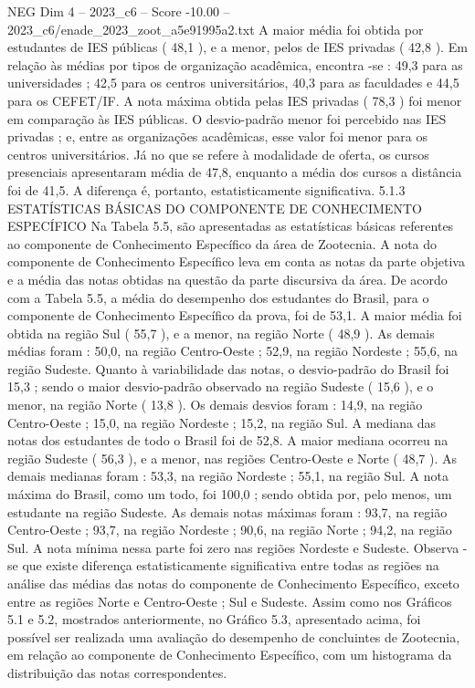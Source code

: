 \begin{textsample}{NEG Dim 4 – 2023\_c6 – Score -10.00 – 2023\_c6/enade\_2023\_zoot\_a5e91995a2.txt}
A maior média foi obtida por estudantes de IES públicas ( 48,1 ), e a menor, pelos de IES privadas ( 42,8 ).
Em relação às médias por tipos de organização acadêmica, encontra -se : 49,3 para as universidades ; 42,5 para os centros universitários, 40,3 para as faculdades e 44,5 para os CEFET/IF.
A nota máxima obtida pelas IES privadas ( 78,3 ) foi menor em comparação às IES públicas.
O desvio-padrão menor foi percebido nas IES privadas ; e, entre as organizações acadêmicas, esse valor foi menor para os centros universitários.
Já no que se refere à modalidade de oferta, os cursos presenciais apresentaram média de 47,8, enquanto a média dos cursos a distância foi de 41,5.
A diferença é, portanto, estatisticamente significativa. 5.1.3 ESTATÍSTICAS BÁSICAS DO COMPONENTE DE CONHECIMENTO ESPECÍFICO Na Tabela 5.5, são apresentadas as estatísticas básicas referentes ao componente de Conhecimento Específico da área de Zootecnia.
A nota do componente de Conhecimento Específico leva em conta as notas da parte objetiva e a média das notas obtidas na questão da parte discursiva da área.
De acordo com a Tabela 5.5, a média do desempenho dos estudantes do Brasil, para o componente de Conhecimento Específico da prova, foi de 53,1.
A maior média foi obtida na região Sul ( 55,7 ), e a menor, na região Norte ( 48,9 ).
As demais médias foram : 50,0, na região Centro-Oeste ; 52,9, na região Nordeste ; 55,6, na região Sudeste.
Quanto à variabilidade das notas, o desvio-padrão do Brasil foi 15,3 ; sendo o maior desvio-padrão observado na região Sudeste ( 15,6 ), e o menor, na região Norte ( 13,8 ).
Os demais desvios foram : 14,9, na região Centro-Oeste ; 15,0, na região Nordeste ; 15,2, na região Sul.
A mediana das notas dos estudantes de todo o Brasil foi de 52,8.
A maior mediana ocorreu na região Sudeste ( 56,3 ), e a menor, nas regiões Centro-Oeste e Norte ( 48,7 ).
As demais medianas foram : 53,3, na região Nordeste ; 55,1, na região Sul.
A nota máxima do Brasil, como um todo, foi 100,0 ; sendo obtida por, pelo menos, um estudante na região Sudeste.
As demais notas máximas foram : 93,7, na região Centro-Oeste ; 93,7, na região Nordeste ; 90,6, na região Norte ; 94,2, na região Sul.
A nota mínima nessa parte foi zero nas regiões Nordeste e Sudeste.
Observa -se que existe diferença estatisticamente significativa entre todas as regiões na análise das médias das notas do componente de Conhecimento Específico, exceto entre as regiões Norte e Centro-Oeste ; Sul e Sudeste.
Assim como nos Gráficos 5.1 e 5.2, mostrados anteriormente, no Gráfico 5.3, apresentado acima, foi possível ser realizada uma avaliação do desempenho de concluintes de Zootecnia, em relação ao componente de Conhecimento Específico, com um histograma da distribuição das notas correspondentes.

\end{textsample}
